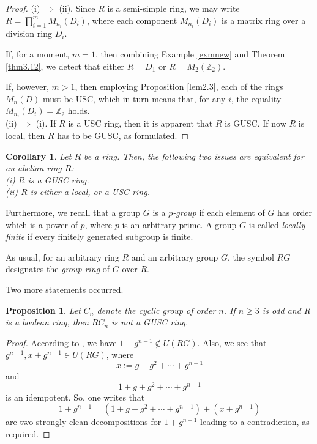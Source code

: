 \documentclass[12pt]{amsart}
\newtheorem{proposition}[theorem]{Proposition}
\newtheorem{corollary}[theorem]{Corollary}
\theoremstyle{definition}
\begin{document}
\begin{proof}
(i) $\Rightarrow$ (ii). Since $R$ is a semi-simple ring, we may write $R = \prod_{i=1}^{m} M_{n_i}(D_i)$, where each component $M_{n_i}(D_i)$ is a matrix ring over a division ring $D_i$.

If, for a moment, $m=1$, then combining Example \ref{exmnew} and Theorem \ref{thm3.12}, we detect that either $R = D_1$ or $R = M_2(\mathbb{Z}_2)$.
	
If, however, $m>1$, then employing Proposition \ref{lem2.3}, each of the rings $M_n(D)$ must be USC, which in turn means that, for any $i$, the equality $M_{n_i}(D_i) = \mathbb{Z}_2$ holds.
\\
(ii) $\Rightarrow$ (i). If $R$ is a USC ring, then it is apparent that $R$ is GUSC. If now $R$ is local, then $R$ has to be GUSC, as formulated.
\end{proof}

\begin{corollary}\label{pronew}
Let $R$ be a ring. Then, the following two issues are equivalent for an abelian ring $R$:
\\
(i) $R$ is a GUSC ring.
\\
(ii) $R$ is either a local, or a USC ring.
\end{corollary}

Furthermore, we recall that a group $G$ is a {\it $p$-group} if each element of $G$ has order which is a power of $p$, where $p$ is an arbitrary prime. A group $G$ is called {\it locally finite} if every finitely generated subgroup is finite.

As usual, for an arbitrary ring $R$ and an arbitrary group $G$, the symbol $RG$ designates the {\it group ring} of $G$ over $R$.

\medskip

Two more statements occurred.

\begin{proposition}\label{exam3.5}
Let $C_{n}$ denote the cyclic group of order $n$. If $n\geq 3$ is odd and $R$ is a boolean ring, then $RC_{n}$ is {\it not} a GUSC ring.
\end{proposition}

\begin{proof}
According to \cite [Example 4.7]{1}, we have $1+g^{n-1}\notin U(RG)$. Also, we see that $g^{n-1}, x+g^{n-1}\in U(RG)$, where $$x := g + g^2 + \cdots + g^{n-1}$$ and $$1+g + g^2 + \cdots + g^{n-1}$$ is an idempotent. So, one writes that $$1+g^{n-1}=(1+g + g^2 + \cdots + g^{n-1})+(x+g^{n-1})$$ are two strongly clean decompositions for $1+g^{n-1}$ leading to a contradiction, as required.
\end{proof}
\end{document}
